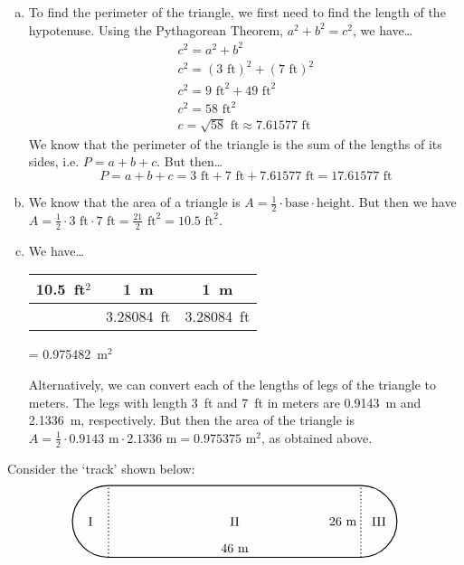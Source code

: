 \documentclass[11pt,letterpaper]{article}
\begin{document}
\sol 
\begin{enumerate}[(a)]
\item To find the perimeter of the triangle, we first need to find the length of the hypotenuse. Using the Pythagorean Theorem, $a^2 + b^2= c^2$, we have\dots
	\[
	\begin{gathered}
	c^2= a^2 + b^2 \\
	c^2= (3 \text{ ft})^2 + (7 \text{ ft})^2 \\
	c^2= 9 \text{ ft}^2 + 49 \text{ ft}^2 \\
	c^2= 58 \text{ ft}^2 \\
	c= \sqrt{58} \text{ ft} \approx 7.61577 \text{ ft}
	\end{gathered}
	\]
We know that the perimeter of the triangle is the sum of the lengths of its sides, i.e. $P= a + b + c$. But then\dots
	\[
	P= a + b + c= 3 \text{ ft} + 7 \text{ ft} + 7.61577 \text{ ft}= 17.61577 \text{ ft}
	\]

\item We know that the area of a triangle is $A= \frac{1}{2} \cdot \text{base} \cdot \text{height}$. But then we have $A= \frac{1}{2} \cdot 3 \text{ ft} \cdot 7 \text{ ft}= \frac{21}{2} \text{ ft}^2 = 10.5 \text{ ft}^2$. 

\item We have\dots \par
	\begin{table}[H]
	\centering
	\begin{tabular}{c||c|c}
	10.5~ft$^2$ & 1~m & 1~m \\ \hline
			   & 3.28084~ft & 3.28084~ft
	\end{tabular} = 0.975482~m$^2$
	\end{table} \par
Alternatively, we can convert each of the lengths of legs of the triangle to meters. The legs with length 3~ft and 7~ft in meters are 0.9143~m and 2.1336~m, respectively. But then the area of the triangle is $A= \frac{1}{2} \cdot 0.9143 \text{ m} \cdot 2.1336 \text{ m}=  0.975375 \text{ m}^2$, as obtained above. 
\end{enumerate}



\newpage



 Consider the `track' shown below:
	\[
	\begin{tikzpicture}
	\draw[line width=0.03cm] (0,0) -- (7,0);
	\draw[line width=0.03cm] (0,2) -- (7,2);
	
	\draw[line width=0.03cm,dotted] (0,0) -- (0,2);
	\draw[line width=0.03cm,dotted] (7,0) -- (7,2);
	 
	\draw[line width=0.03cm] (0,2) arc(90:270:1);
	\draw[line width=0.03cm] (7,0) arc(270:450:1);
	
	\node at (3.5,0.25) {$46$~m};
	\node at (6.5,1) {$26$~m};
	
	\node at (-0.5,1) {I};
	\node at (3.5,1) {II};
	\node at (7.5,1) {III};
	\end{tikzpicture}
	\]
\end{document}
